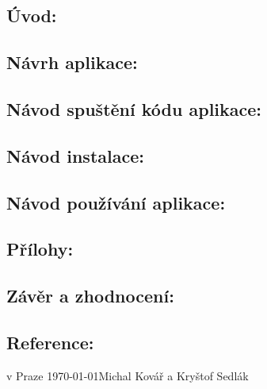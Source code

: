 
\newcommand{\mysubsection}[1]{\hspace{1 cm}\subsection*{#1}\setstretch{1.5}}





\maketitle

\subsection*{Úvod:}


\subsection*{Návrh aplikace:}


\subsection*{Návod spuštění kódu aplikace:}


\subsection*{Návod instalace:}


\subsection*{Návod používání aplikace:}


\subsection*{Přílohy:}


\subsection*{Závěr a zhodnocení:}


\subsection*{Reference:}


\vspace{5 cm}

\noindent
v Praze \today \hfill Michal Kovář a Kryštof Sedlák



